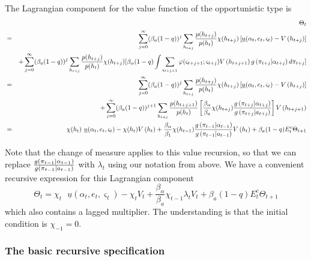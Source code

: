 \documentclass[12pt,letter,leqno]{article}
\theoremstyle{asn}
\theoremstyle{lem}
\theoremstyle{slem}
\theoremstyle{prop}
\theoremstyle{appprop}
\theoremstyle{rem}
\theoremstyle{defn}
\begin{document}
\begin{oldversion}
The Lagrangian component for the value function of the opportunistic type is%
\begin{eqnarray*}
&&\Theta _{t} \\
&=&\sum_{j=0}^{\infty }(\beta_{a}(1-q))^{j}\sum_{h_{t+j}}\frac{p(h_{t+j})}{%
p(h_{t})}\chi (h_{t+j})\left[ \underline{u}(\alpha _{t},e_{t},\varsigma
_{t})-V\left( h_{t+j}\right) \right] \\
&&+\sum_{j=0}^{\infty }(\beta_{a}(1-q))^{j}\sum_{h_{t+j}}\frac{p(h_{t+j})}{%
p(h_{t})}\chi (h_{t+j})[\beta_{\alpha}(1-q)\int \sum_{\varsigma
_{t+j+1}}\varphi (\varsigma _{t+j+1};\varsigma _{t+j})V\left(
h_{t+j+1}\right) g\left( \pi _{t+j}|\alpha _{t+j}\right) d\pi
_{t+j}] \\
&=&\sum_{j=0}^{\infty }(\beta_{a}(1-q))^{j}\sum_{h_{t+j}}\frac{p(h_{t+j})}{%
p(h_{t})}\chi (h_{t+j})\left[ \underline{u}(\alpha _{t},e_{t},\varsigma
_{t})-V\left( h_{t+j}\right) \right] \\
&&+\sum_{j=0}^{\infty }(\beta_{a}(1-q))^{j+1}\sum_{h_{t+j}}\frac{%
p(h_{t+j+1})}{p(h_{t})}\left[ \frac{\beta_{\alpha}}{%
\beta_{a}}\chi (h_{t+j})\frac{g\left( \pi _{t+j}|\alpha
_{t+j}\right) }{g\left( \pi _{t+j}|a_{t+j}\right) }\right] V%
\left( h_{t+j+1}\right) \\
&=&\chi (h_{t})\text{ }\underline{u}(\alpha _{t},e_{t},\varsigma _{t})-\chi (h_{t})V\left( h_{t}\right) +\frac{\beta_{\alpha}}{\beta
_{1}}\chi (h_{t-1})\frac{g\left( \pi _{t-1}|\alpha
_{t-1}\right) }{g\left( \pi _{t-1}|a_{t-1}\right) }V\left( h_{t}\right)
+\beta_{a}(1-q)E_{t}^{c}\Theta _{t+1}
\end{eqnarray*}

Note that the change of measure applies to this value recursion, so that we
can replace $\frac{g\left( \pi _{t-1}|\alpha _{t-1}\right) }{%
g\left( \pi _{t-1}|a_{t-1}\right) }$ with $\lambda _{t}$ using our notation
from above. We have a convenient recursive expression for this Lagrangian
component 
\begin{equation}
\Theta _{t}=\chi _{t}\text{ }\underline{u}(\alpha _{t},e_{t},\varsigma
_{t})-\chi _{t}V_{t}+\frac{\beta_{\alpha}}{\beta_{a}}\chi
_{t-1}\lambda _{t}V_{t}+\beta_{a}(1-q)E_{t}^{c}\Theta _{t+1}
\label{THETArecursive}
\end{equation}%
which also contains a lagged multiplier. The understanding is that the
initial condition is $\chi _{-1}=0$.

\subsubsection{The basic recursive specification}
\label{appsec:recursive8ext}


\end{oldversion}
\end{document}
